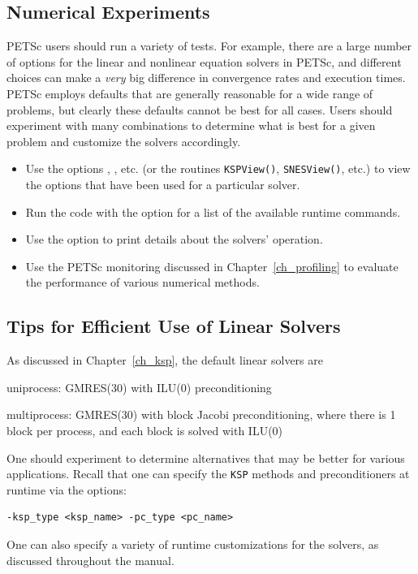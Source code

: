 {{{\subsection{Numerical Experiments}

PETSc users should run a variety of tests.  For example, there are a large number of options
for the linear and nonlinear equation solvers in PETSc, and different
choices can make a {\em very} big difference in convergence rates and execution
times.  PETSc employs defaults that are generally reasonable for a wide
range of problems, but clearly these defaults cannot be best for all
cases.  Users should experiment with many combinations to determine
what is best for a given problem and customize the solvers accordingly.
\begin{itemize}
\item Use the options , , etc. (or the routines
     \lstinline{KSPView()}, \lstinline{SNESView()}, etc.) to view the options that have been
     used for a particular solver.
\item Run the code with the option  for a list of the available
     runtime commands.
\item Use the option  to print details about the solvers' operation.
\item Use the PETSc monitoring discussed in Chapter~\ref{ch_profiling}
     to evaluate the performance of various numerical methods.
\end{itemize}

\subsection{Tips for Efficient Use of Linear Solvers}
\label{sec_slestips}

As discussed in Chapter~\ref{ch_ksp}, the default linear solvers are
\begin{tightitemize}
\item uniprocess: GMRES(30) with ILU(0) preconditioning\\
\item multiprocess: GMRES(30) with block Jacobi preconditioning, where there
                     is 1 block per process, and each block is solved with ILU(0)\\
\end{tightitemize}
One should experiment to determine alternatives that may be better for
various applications.  Recall that one can specify the \lstinline{KSP} methods and
preconditioners at runtime via the options:
\begin{lstlisting}
-ksp_type <ksp_name> -pc_type <pc_name>
\end{lstlisting}
One can also specify a variety of runtime customizations for the
solvers, as discussed throughout the manual.

}}}
